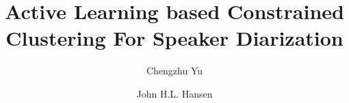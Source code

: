 \documentclass[final,authoryear,5p,times,twocolumn]{elsarticle}
\begin{document}
\begin{frontmatter}


 \title{Active Learning based Constrained Clustering For Speaker Diarization}
\author{Chengzhu Yu}
\author{John H.L. Hansen}
\address{Center for Robust Speech Systems (CRSS)\\ Department of Electrical Engineering, The University of Texas at Dallas\\ Richardson, TX 75080-3021, U.S.A. }


\end{frontmatter}
\end{document}
